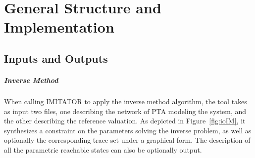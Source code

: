 \documentclass[a4paper,11pt]{report}
\newcommand{\imitator}{\textsf{IMITATOR}}
\begin{document}
\chapter[Implementation]{General Structure and Implementation} \label{sec:implementation}



\section{Inputs and Outputs}



\paragraph{Inverse Method}
When calling \imitator{} to apply the inverse method algorithm, the tool takes as input two files, one describing the network of PTA modeling the system, and the other describing the reference valuation.
As depicted in Figure~\ref{fig:ioIM}, it synthesizes a constraint on the parameters solving the inverse problem, as well as optionally the corresponding trace set under a graphical form.
The description of all the parametric reachable states can also be optionally output.
\end{document}
